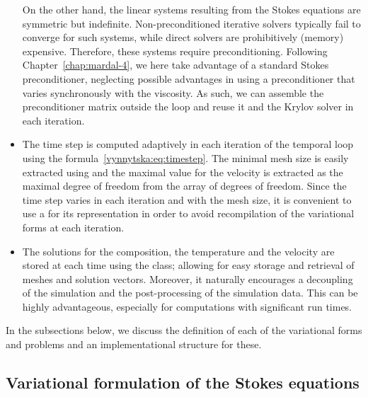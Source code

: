 \begin{itemize}
  On the other hand, the linear systems resulting from the Stokes
  equations are symmetric but indefinite. Non-preconditioned iterative
  solvers typically fail to converge for such systems, while direct
  solvers are prohibitively (memory) expensive. Therefore, these
  systems require preconditioning. Following
  Chapter~\ref{chap:mardal-4}, we here take advantage of a standard
  Stokes preconditioner, neglecting possible advantages in using a
  preconditioner that varies synchronously with the viscosity.  As
  such, we can assemble the preconditioner matrix outside the loop and
  reuse it and the Krylov solver in each iteration.
\item
  The time step  is computed adaptively in each iteration of
  the temporal loop using the
  formula~\eqref{vynnytska:eq:timestep}. The minimal mesh size is
  easily extracted using  and the maximal value for
  the velocity is extracted as the maximal degree of freedom from
  the  array of degrees of freedom. Since the time step
  varies in each iteration and with the mesh size, it is convenient to
  use a  for its representation in order to avoid
  recompilation of the variational forms at each iteration.
\item
  The solutions for the composition, the temperature and the velocity
  are stored at each time using the  class; allowing
  for easy storage and retrieval of meshes and solution
  vectors. Moreover, it naturally encourages a decoupling of the
  simulation and the post-processing of the simulation data. This can
  be highly advantageous, especially for computations with significant
  run times.
\end{itemize}
In the subsections below, we discuss the definition of each of the
variational forms and problems and an implementational structure for
these.

\subsection{Variational formulation of the Stokes equations}

